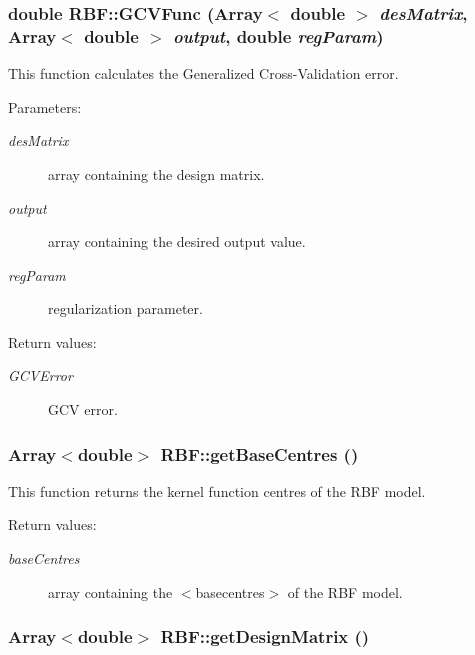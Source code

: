\subsubsection{\setlength{\rightskip}{0pt plus 5cm}double RBF::GCVFunc (Array$<$ double $>$ {\em des\-Matrix}, Array$<$ double $>$ {\em output}, double {\em reg\-Param})\hspace{0.3cm}{\tt  [static]}}\label{classRBF_e8}


This function calculates the Generalized Cross-Validation error. 

\begin{Desc}
\item[Parameters:]
\begin{description}
\item[{\em des\-Matrix}]array containing the design matrix. \item[{\em output}]array containing the desired output value. \item[{\em reg\-Param}]regularization parameter. \end{description}
\end{Desc}
\begin{Desc}
\item[Return values:]
\begin{description}
\item[{\em GCVError}]GCV error.\end{description}
\end{Desc}
\subsubsection{\setlength{\rightskip}{0pt plus 5cm}Array$<$double$>$ RBF::get\-Base\-Centres ()}\label{classRBF_a21}


This function returns the kernel function centres of the RBF model. 

\begin{Desc}
\item[Return values:]
\begin{description}
\item[{\em base\-Centres}]array containing the $<$basecentres$>$ of the RBF model.\end{description}
\end{Desc}
\subsubsection{\setlength{\rightskip}{0pt plus 5cm}Array$<$double$>$ RBF::get\-Design\-Matrix ()}\label{classRBF_a17}


